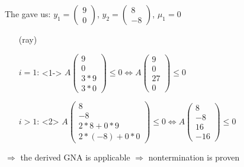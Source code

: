 \begin{frame}
	\begin{example}
		The \solver gave us: $y_1=\begin{pmatrix} 9 \\ 0 \end{pmatrix}$, $y_2=\begin{pmatrix} 8 \\ -8 \end{pmatrix}$, $\mu_1=0$\newline
		\begin{itemize}
			\setlength{\itemindent}{0.5cm}
			\item[(ray)]
			\item[$i=1$:]<1->  $A\begin{pmatrix} 9 \\ 0 \\ 3*9 \\ 3*0 \end{pmatrix} \le 0 \Leftrightarrow A\begin{pmatrix} 9 \\ 0 \\ 27 \\ 0 \end{pmatrix} \le 0$ \checkmark
			\item[$i>1$:]<2> $A\begin{pmatrix} 8 \\ -8 \\ 2*8+0*9 \\ 2*(-8)+0*0 \end{pmatrix} \le 0 \Leftrightarrow A\begin{pmatrix} 8 \\ -8 \\ 16 \\ -16 \end{pmatrix} \le 0$ \checkmark
		\end{itemize}
		$\Rightarrow$ the derived GNA is applicable $\Rightarrow$ nontermination is proven
	\end{example}
\end{frame}






